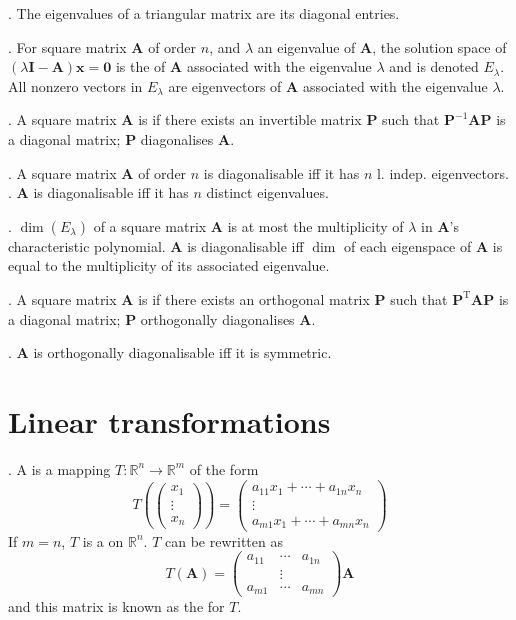 \documentclass{slnotes}
\newcommand*{\TT}{\mathrm{T}}
\begin{document}
. The eigenvalues of a triangular matrix are its diagonal entries.

. For square matrix \(\mathbf A\) of order \(n\), and \(\lambda\) an eigenvalue of \(\mathbf A\), the solution space of \((\lambda\mathbf I - \mathbf A)\mathbf x = \mathbf 0\) is the  of \(\mathbf A\) associated with the eigenvalue \(\lambda\) and is denoted \(E_\lambda\). All nonzero vectors in \(E_\lambda\) are eigenvectors of \(\mathbf A\) associated with the eigenvalue \(\lambda\).

. A square matrix \(\mathbf A\) is  if there exists an invertible matrix \(\mathbf P\) such that \(\mathbf P^{-1}\mathbf{AP}\) is a diagonal matrix; \(\mathbf P\) diagonalises \(\mathbf A\).

. A square matrix \(\mathbf A\) of order \(n\) is diagonalisable iff it has \(n\) l. indep. eigenvectors. . \(\mathbf A\) is diagonalisable iff it has \(n\) distinct eigenvalues.

. \(\dim(E_\lambda)\) of a square matrix \(\mathbf A\) is at most the multiplicity of \(\lambda\) in \(\mathbf{A}\)'s characteristic polynomial. \(\mathbf A\) is diagonalisable iff \(\dim\) of each eigenspace of \(\mathbf A\) is equal to the multiplicity of its associated eigenvalue.

. A square matrix \(\mathbf A\) is  if there exists an orthogonal matrix \(\mathbf P\) such that \(\mathbf P^\TT\mathbf{AP}\) is a diagonal matrix; \(\mathbf P\) orthogonally diagonalises \(\mathbf A\).

. \(\mathbf A\) is orthogonally diagonalisable iff it is symmetric.

\chapter{Linear transformations}
. A  is a mapping \(T : \mathbb{R}^n \to \mathbb{R}^m\) of the form
\[T\left(\begin{pmatrix}x_1\\\vdots\\x_n\end{pmatrix}\right) = \begin{pmatrix}
a_{11}x_1 + \cdots + a_{1n}x_n\\
\vdots\\
a_{m1}x_1 + \cdots + a_{mn}x_n
\end{pmatrix}\]
If \(m = n\), \(T\) is a  on \(\mathbb R^n\). \(T\) can be rewritten as
\[T(\mathbf A) = \begin{pmatrix}
a_{11} & \cdots & a_{1n}\\
&\vdots&\\
a_{m1} & \cdots & a_{mn}
\end{pmatrix}\mathbf{A}\] and this matrix is known as the  for \(T\).
\end{document}

